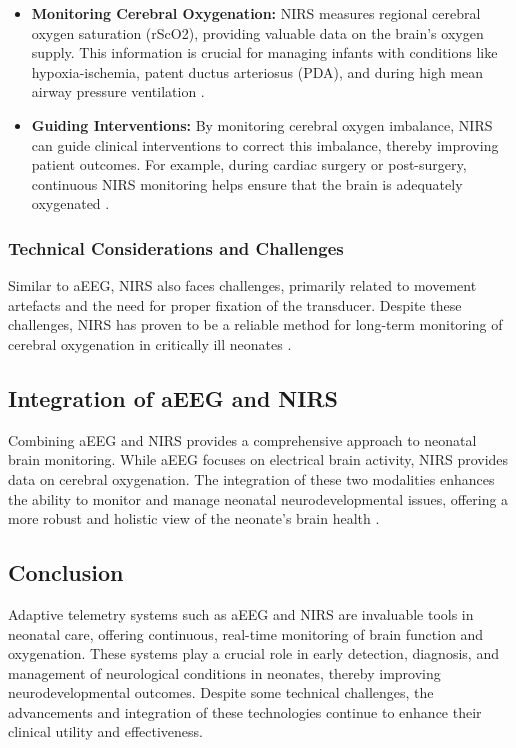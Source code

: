 \documentclass[12pt,journal,compsoc]{IEEEtran}
\begin{document}
\begin{itemize}
    \item \textbf{Monitoring Cerebral Oxygenation:} NIRS measures regional cerebral oxygen saturation (rScO2), providing valuable data on the brain's oxygen supply. This information is crucial for managing infants with conditions like hypoxia-ischemia, patent ductus arteriosus (PDA), and during high mean airway pressure ventilation \cite{IEEEhowto:toet}.
    \item \textbf{Guiding Interventions:} By monitoring cerebral oxygen imbalance, NIRS can guide clinical interventions to correct this imbalance, thereby improving patient outcomes. For example, during cardiac surgery or post-surgery, continuous NIRS monitoring helps ensure that the brain is adequately oxygenated \cite{IEEEhowto:toet}.
\end{itemize}

\subsubsection{Technical Considerations and Challenges}
Similar to aEEG, NIRS also faces challenges, primarily related to movement artefacts and the need for proper fixation of the transducer. Despite these challenges, NIRS has proven to be a reliable method for long-term monitoring of cerebral oxygenation in critically ill neonates \cite{IEEEhowto:toet}.

\subsection{Integration of aEEG and NIRS}
Combining aEEG and NIRS provides a comprehensive approach to neonatal brain monitoring. While aEEG focuses on electrical brain activity, NIRS provides data on cerebral oxygenation. The integration of these two modalities enhances the ability to monitor and manage neonatal neurodevelopmental issues, offering a more robust and holistic view of the neonate's brain health \cite{IEEEhowto:toet}.

\subsection{Conclusion}
Adaptive telemetry systems such as aEEG and NIRS are invaluable tools in neonatal care, offering continuous, real-time monitoring of brain function and oxygenation. These systems play a crucial role in early detection, diagnosis, and management of neurological conditions in neonates, thereby improving neurodevelopmental outcomes. Despite some technical challenges, the advancements and integration of these technologies continue to enhance their clinical utility and effectiveness.
\end{document}
